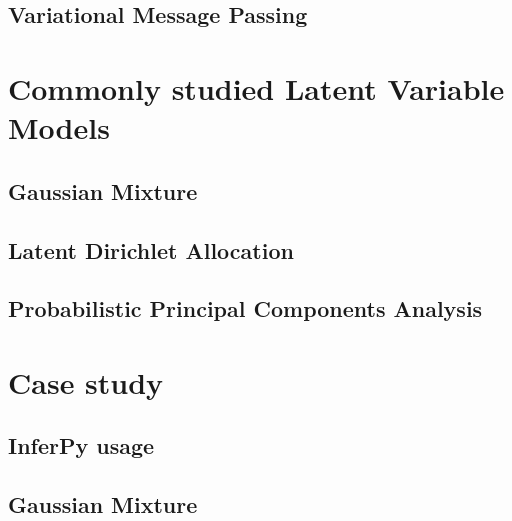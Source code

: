 \documentclass[twoside,openright,titlepage,numbers=noenddot,openany,headinclude,footinclude=true, cleardoublepage=empty,abstractoff,BCOR=5mm,paper=a4,fontsize=11pt, dvipsnames]{scrreprt}
\begin{document}


\chapter{Variational Message Passing}




\ctparttext{
  \color{black}
  \begin{center}

  \end{center}
}
\part{Commonly studied Latent Variable Models}

\chapter{Gaussian Mixture}


\chapter{Latent Dirichlet Allocation}


\chapter{Probabilistic Principal Components Analysis}


\ctparttext{
  \color{black}
  \begin{center}
    
  \end{center}
}
\part{Case study}

\chapter{InferPy usage}



\chapter{Gaussian Mixture}

\clearpage
\nocite{*}


\end{document}
